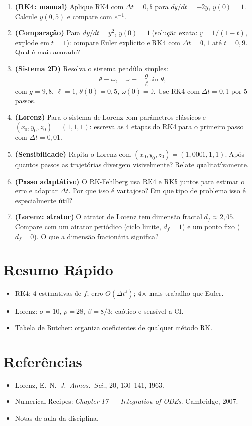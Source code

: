 \documentclass[12pt,a4paper]{article}
\begin{document}
\begin{enumerate}
  \item \textbf{(RK4: manual)} Aplique RK4 com $\Delta t=0{,}5$ para $dy/dt = -2y$, $y(0)=1$. Calcule $y(0{,}5)$ e compare com $e^{-1}$.
  
  \item \textbf{(Compara\c{c}\~ao)} Para $dy/dt = y^2$, $y(0)=1$ (solu\c{c}\~ao exata: $y=1/(1-t)$, explode em $t=1$): compare Euler expl\'icito e RK4 com $\Delta t=0{,}1$ at\'e $t=0{,}9$. Qual \'e mais acurado?
  
  \item \textbf{(Sistema 2D)} Resolva o sistema pend\^ulo simples:
  \[
  \dot\theta = \omega, \quad \dot\omega = -\frac{g}{\ell}\sin\theta,
  \]
  com $g=9{,}8$, $\ell=1$, $\theta(0)=0{,}5$, $\omega(0)=0$. Use RK4 com $\Delta t=0{,}1$ por 5 passos.
  
  \item \textbf{(Lorenz)} Para o sistema de Lorenz com par\^ametros cl\'assicos e $(x_0, y_0, z_0) = (1, 1, 1)$: escreva as 4 etapas do RK4 para o primeiro passo com $\Delta t=0{,}01$.
  
  \item \textbf{(Sensibilidade)} Repita o Lorenz com $(x_0, y_0, z_0) = (1{,}0001, 1, 1)$. Ap\'os quantos passos as trajet\'orias divergem visivelmente? Relate qualitat\'ivamente.
  
  \item \textbf{(Passo adapt\'ativo)} O RK-Fehlberg usa RK4 e RK5 juntos para estimar o erro e adaptar $\Delta t$. Por que isso \'e vantajoso? Em que tipo de problema isso \'e especialmente \'util?
  
  \item \textbf{(Lorenz: atrator)} O atrator de Lorenz tem dimens\~ao fractal $d_f \approx 2{,}05$. Compare com um atrator peri\'odico (ciclo limite, $d_f=1$) e um ponto fixo ($d_f=0$). O que a dimens\~ao fracion\'aria significa?
\end{enumerate}

\section*{Resumo R\'apido}
\begin{itemize}
  \item RK4: 4 estimativas de $f$; erro $O(\Delta t^4)$; 4$\times$ mais trabalho que Euler.
  \item Lorenz: $\sigma=10$, $\rho=28$, $\beta=8/3$; ca\'otico e sens\'ivel a CI.
  \item Tabela de Butcher: organiza coeficientes de qualquer m\'etodo RK.
\end{itemize}

\section*{Refer\^encias}
\begin{itemize}
  \item Lorenz, E.\ N.\ \textit{J.\ Atmos.\ Sci.}, 20, 130--141, 1963.
  \item Numerical Recipes: \textit{Chapter 17 --- Integration of ODEs}. Cambridge, 2007.
  \item Notas de aula da disciplina.
\end{itemize}
\end{document}
